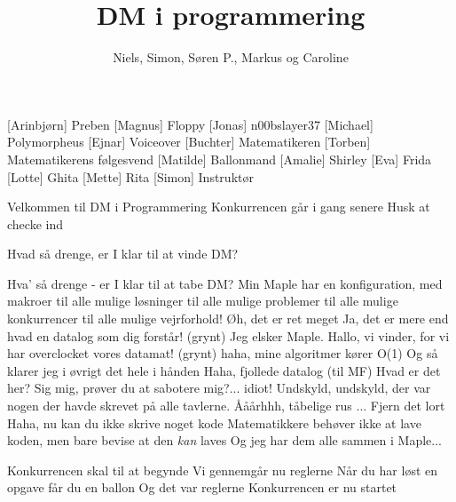 \documentclass[a4paper,11pt]{article}
\title{DM i programmering}
\author{Niels, Simon, Søren P., Markus og Caroline}
\begin{document}
\maketitle

\begin{roles}
  [Arinbjørn] Preben
  [Magnus] Floppy
  [Jonas] n00bslayer37
  [Michael] Polymorpheus
  [Ejnar] Voiceover
  [Buchter] Matematikeren
  [Torben] Matematikerens følgesvend
  [Matilde] Ballonmand
  [Amalie] Shirley
  [Eva] Frida
  [Lotte] Ghita
  [Mette] Rita
  [Simon] Instruktør
\end{roles}

\begin{sketch}

   Velkommen til DM i Programmering
   Konkurrencen går i gang senere
   Husk at checke ind

   Hvad så drenge, er I klar til at vinde DM?

   Hva' så drenge - er I klar til at tabe DM?
   Min Maple har en konfiguration, med makroer til alle mulige løsninger til alle mulige problemer til alle mulige konkurrencer til alle mulige vejrforhold!
   Øh, det er ret meget
   Ja, det er mere end hvad en datalog som dig forstår!
   (grynt) Jeg elsker Maple.
   Hallo, vi vinder, for vi har overclocket vores datamat!
   (grynt) haha, mine algoritmer kører O(1)
   Og så klarer jeg i øvrigt det hele i hånden
   Haha, fjollede datalog
   (til MF) Hvad er det her? Sig mig, prøver du at sabotere mig?... idiot!
   Undskyld, undskyld, der var nogen der havde skrevet på alle tavlerne.
   Ååårhhh, tåbelige rus ... Fjern det lort
   Haha, nu kan du ikke skrive noget kode
   Matematikkere behøver ikke at lave koden, men bare bevise at den \emph{kan} laves
   Og jeg har dem alle sammen i Maple...

   Konkurrencen skal til at begynde
   Vi gennemgår nu reglerne
   Når du har løst en opgave får du en ballon
   Og det var reglerne
   Konkurrencen er nu startet


\end{sketch}
\end{document}
